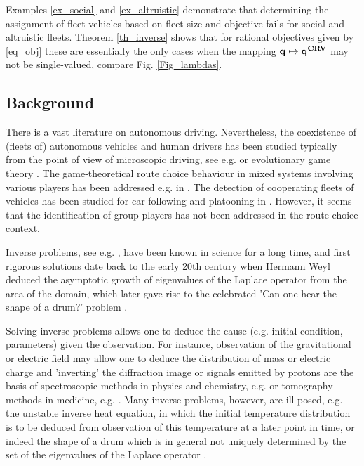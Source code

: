 \documentclass[a4paper,11pt]{article}
\begin{document}
Examples \ref{ex_social} and \ref{ex_altruistic} demonstrate that determining the assignment of fleet vehicles based on fleet size and objective fails for social and altruistic fleets. Theorem \ref{th_inverse} shows that for rational objectives given by \eqref{eq_obj} these are essentially the only cases when the mapping $\bold{q} \mapsto \bold{q^{CRV}}$ may not be single-valued, compare Fig. \ref{Fig_lambdas}. 


\subsection{Background}
There is a vast literature on autonomous driving. Nevertheless, the coexistence of (fleets of) autonomous vehicles and human drivers has been studied typically from the point of view of microscopic driving, see e.g. \cite{Gora2020, Farah2022} or evolutionary game theory \cite{Bitar2022}. The game-theoretical route choice behaviour in mixed systems involving various players has been addressed e.g. in \cite{Yang2007, Harker1988}. The detection of cooperating fleets of vehicles has been studied for car following and platooning in \cite{Charlottin2024}.  However, it seems that the identification of group players has not been addressed in the route choice context. 

Inverse problems, see e.g. \cite{Groetsch}, have been known in science for a long time, and first rigorous solutions date back to the early 20th century when Hermann Weyl \cite{Weyl} deduced the asymptotic growth of eigenvalues of the Laplace operator from the area of the domain, which later gave rise to the celebrated 'Can one hear the shape of a drum?' problem \cite{Kac}. 

Solving inverse problems allows one to deduce the cause (e.g. initial condition, parameters) given the observation. For instance, observation of the gravitational or electric field may allow one to deduce the distribution of mass or electric charge and 'inverting' the diffraction image or signals emitted by protons are the basis of spectroscopic methods in physics and chemistry, e.g. \cite{Woolfson}  or tomography methods in medicine, e.g. \cite{Morris}. Many inverse problems, however, are ill-posed, e.g. the unstable inverse heat equation, in which the initial temperature distribution is to be deduced from observation of this temperature at a later point in time, or indeed the shape of a drum which is in general not uniquely determined by the set of the eigenvalues of the Laplace operator \cite{GordonDrum}. 
\end{document}
